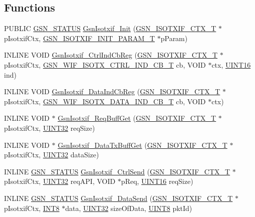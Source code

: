 \subsection*{Functions}
\begin{DoxyCompactItemize}
\item 
PUBLIC \hyperlink{a00660_gada5951904ac6110b1fa95e51a9ddc217}{GSN\_\-STATUS} \hyperlink{a00521_abc9d5709f340ca4e17d131e1bb62452a}{GsnIsotxif\_\-Init} (\hyperlink{a00105}{GSN\_\-ISOTXIF\_\-CTX\_\-T} $\ast$pIsotxifCtx, \hyperlink{a00106}{GSN\_\-ISOTXIF\_\-INIT\_\-PARAM\_\-T} $\ast$pParam)
\item 
INLINE VOID \hyperlink{a00521_a796010862c1446f3782ec57bdf213787}{GsnIsotxif\_\-CtrlIndCbReg} (\hyperlink{a00105}{GSN\_\-ISOTXIF\_\-CTX\_\-T} $\ast$pIsotxifCtx, \hyperlink{a00635_gac721992ff2f8c904a29e80d4b2eaead3}{GSN\_\-WIF\_\-ISOTX\_\-CTRL\_\-IND\_\-CB\_\-T} cb, VOID $\ast$ctx, \hyperlink{a00660_ga09f1a1fb2293e33483cc8d44aefb1eb1}{UINT16} ind)
\item 
INLINE VOID \hyperlink{a00521_a9e559b9d089e882c9056fd9754b6f17a}{GsnIsotxif\_\-DataIndCbReg} (\hyperlink{a00105}{GSN\_\-ISOTXIF\_\-CTX\_\-T} $\ast$pIsotxifCtx, \hyperlink{a00635_ga9630fce1058035404e218cc275052c03}{GSN\_\-WIF\_\-ISOTX\_\-DATA\_\-IND\_\-CB\_\-T} cb, VOID $\ast$ctx)
\item 
INLINE VOID $\ast$ \hyperlink{a00521_a8f5ca5a5f5fce715ab6d70a8cd50896c}{GsnIsotxif\_\-ReqBuffGet} (\hyperlink{a00105}{GSN\_\-ISOTXIF\_\-CTX\_\-T} $\ast$pIsotxifCtx, \hyperlink{a00660_gae1e6edbbc26d6fbc71a90190d0266018}{UINT32} reqSize)
\item 
INLINE VOID $\ast$ \hyperlink{a00521_af933ec0dba7fa993e8ebadd9f4f8a175}{GsnIsotxif\_\-DataTxBuffGet} (\hyperlink{a00105}{GSN\_\-ISOTXIF\_\-CTX\_\-T} $\ast$pIsotxifCtx, \hyperlink{a00660_gae1e6edbbc26d6fbc71a90190d0266018}{UINT32} dataSize)
\item 
INLINE \hyperlink{a00660_gada5951904ac6110b1fa95e51a9ddc217}{GSN\_\-STATUS} \hyperlink{a00521_a579ac891de19798b8228064b9937d9cd}{GsnIsotxif\_\-CtrlSend} (\hyperlink{a00105}{GSN\_\-ISOTXIF\_\-CTX\_\-T} $\ast$pIsotxifCtx, \hyperlink{a00660_gae1e6edbbc26d6fbc71a90190d0266018}{UINT32} reqAPI, VOID $\ast$pReq, \hyperlink{a00660_ga09f1a1fb2293e33483cc8d44aefb1eb1}{UINT16} reqSize)
\item 
INLINE \hyperlink{a00660_gada5951904ac6110b1fa95e51a9ddc217}{GSN\_\-STATUS} \hyperlink{a00521_a51c8566083314b7f98223e438ceefbf4}{GsnIsotxif\_\-DataSend} (\hyperlink{a00105}{GSN\_\-ISOTXIF\_\-CTX\_\-T} $\ast$pIsotxifCtx, \hyperlink{a00660_ga307b8734c020247f6bac4fcde0dcfbb9}{INT8} $\ast$data, \hyperlink{a00660_gae1e6edbbc26d6fbc71a90190d0266018}{UINT32} sizeOfData, \hyperlink{a00660_gab27e9918b538ce9d8ca692479b375b6a}{UINT8} pktId)
\end{DoxyCompactItemize}


